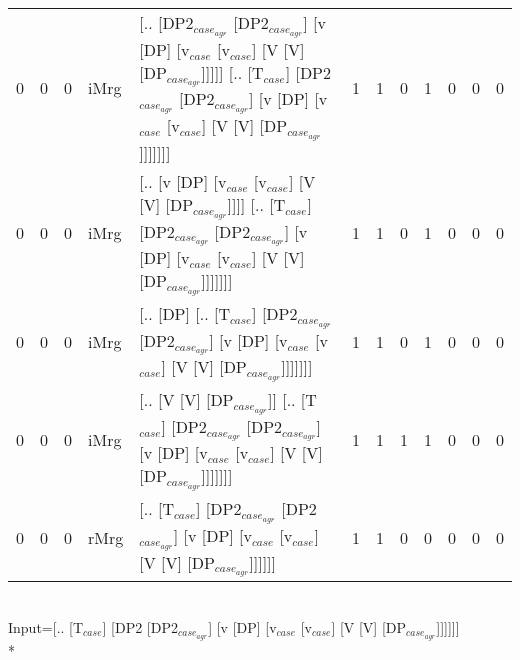 \begin{tabularx}{\linewidth}{rrrlXrrrrrrr}
   0 &       0 &   0 & iMrg & [.. [DP2$_{case_{agr}}$ [DP2$_{case_{agr}}$] [v [DP] [v$_{case}$ [v$_{case}$] [V [V] [DP$_{case_{agr}}$]]]]] [.. [T$_{case}$] [DP2$_{case_{agr}}$ [DP2$_{case_{agr}}$] [v [DP] [v$_{case}$ [v$_{case}$] [V [V] [DP$_{case_{agr}}$]]]]]]] &             1 &             1 &                  0 &            1 &              0 &             0 &              0 \\
   0 &       0 &   0 & iMrg & [.. [v [DP] [v$_{case}$ [v$_{case}$] [V [V] [DP$_{case_{agr}}$]]]] [.. [T$_{case}$] [DP2$_{case_{agr}}$ [DP2$_{case_{agr}}$] [v [DP] [v$_{case}$ [v$_{case}$] [V [V] [DP$_{case_{agr}}$]]]]]]]                               &             1 &             1 &                  0 &            1 &              0 &             0 &              0 \\
   0 &       0 &   0 & iMrg & [.. [DP] [.. [T$_{case}$] [DP2$_{case_{agr}}$ [DP2$_{case_{agr}}$] [v [DP] [v$_{case}$ [v$_{case}$] [V [V] [DP$_{case_{agr}}$]]]]]]]                                                                           &             1 &             1 &                  0 &            1 &              0 &             0 &              0 \\
   0 &       0 &   0 & iMrg & [.. [V [V] [DP$_{case_{agr}}$]] [.. [T$_{case}$] [DP2$_{case_{agr}}$ [DP2$_{case_{agr}}$] [v [DP] [v$_{case}$ [v$_{case}$] [V [V] [DP$_{case_{agr}}$]]]]]]]                                                          &             1 &             1 &                  1 &            1 &              0 &             0 &              0 \\
   0 &       0 &   0 & rMrg & [.. [T$_{case}$] [DP2$_{case_{agr}}$ [DP2$_{case_{agr}}$] [v [DP] [v$_{case}$ [v$_{case}$] [V [V] [DP$_{case_{agr}}$]]]]]]                                                                                     &             1 &             1 &                  0 &            0 &              0 &             0 &              0 \\
\hline
\end{tabularx}\endgroup\\
\begingroup\scriptsize Input=[.. [T$_{case}$] [DP2 [DP2$_{case_{agr}}$] [v [DP] [v$_{case}$ [v$_{case}$] [V [V] [DP$_{case_{agr}}$]]]]]]\\*
